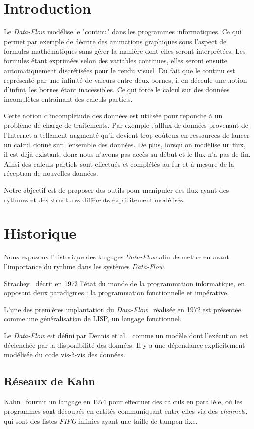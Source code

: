 \documentclass{llncs}
\newcommand{\DF}{\emph{Data-Flow} }
\newcommand{\DFc}{\emph{Data-Flow}}
\newcommand{\DFp}{\emph{Data-Flow}. }
\begin{document}
\section{Introduction}
Le \DF modélise le "continu" dans les programmes informatiques.
Ce qui permet par exemple de décrire des animations graphiques sous l'aspect de
formules mathématiques sans gérer la manière dont elles seront interprêtées.
Les formules étant exprimées selon des variables continues, elles seront ensuite
automatiquement discrétisées pour le rendu visuel.
Du fait que le continu est représenté par une infinité de valeurs entre deux bornes,
il en découle une notion d'infini, les bornes étant inacessibles.
Ce qui force le calcul sur des données incomplètes entrainant des calculs partiels.

Cette notion d'incomplétude des données est utilisée pour répondre à un problème
de charge de traitements.
Par exemple l'afflux de données provenant de l'Internet a tellement augmenté qu'il
devient trop coûteux en ressources de lancer un calcul donné sur l'ensemble des
données.
De plus, lorsqu'on modélise un flux, il est déjà existant, donc nous n'avons pas
accès au début et le flux n'a pas de fin.
Ainsi des calculs partiels sont effectués et complétés au fur et à mesure de la
réception de nouvelles données.

Notre objectif est de proposer des outils pour manipuler des flux ayant des
rythmes et des structures différents explicitement modélisés.

\section{Historique}
Nous exposons l'historique des langages \DF afin
de mettre en avant l'importance du rythme dans les systèmes \DFp

Strachey~\cite{Strachey73} décrit en 1973 l'état du monde de la programmation
informatique, en opposant deux paradigmes : la programmation fonctionnelle et impérative.

L'une des premières implantation du \DFc~\cite{Dennis72} réalisée
en 1972 est présentée comme une généralisation de LISP, un langage fonctionnel.

Le \DF est défini par Dennis et al.~\cite{Dennis72} comme un modèle dont l'exécution
est déclenchée par la disponibilité des données.
Il y a une dépendance explicitement modélisée du code vis-à-vis des données.

\subsection{Réseaux de Kahn}
Kahn~\cite{Kahn74} fournit un langage en 1974 pour effectuer des calculs en parallèle,
où les programmes sont découpés en entités communiquant entre elles via des
\emph{channel}s, qui sont des listes \emph{FIFO} infinies ayant une taille de
tampon fixe.
\end{document}
